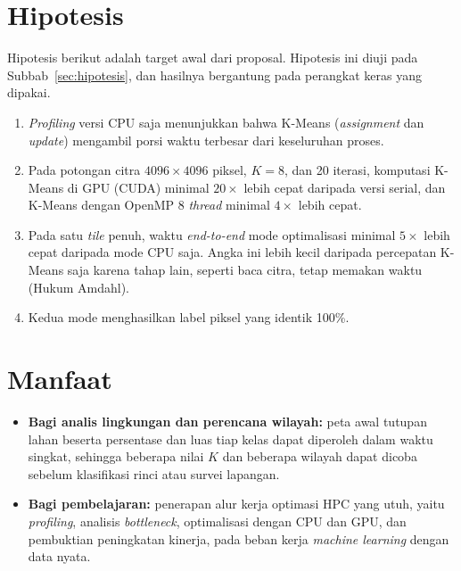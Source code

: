 \section{Hipotesis}
\label{sec:hipotesisawal}
Hipotesis berikut adalah target awal dari proposal. Hipotesis ini diuji pada Subbab~\ref{sec:hipotesis}, dan hasilnya bergantung pada perangkat keras yang dipakai.
\begin{enumerate}
    \item \emph{Profiling} versi CPU saja menunjukkan bahwa K-Means (\emph{assignment} dan \emph{update}) mengambil porsi waktu terbesar dari keseluruhan proses.
    \item Pada potongan citra $4096\times4096$ piksel, $K=8$, dan 20 iterasi, komputasi K-Means di GPU (CUDA) minimal $20\times$ lebih cepat daripada versi serial, dan K-Means dengan OpenMP 8 \emph{thread} minimal $4\times$ lebih cepat.
    \item Pada satu \emph{tile} penuh, waktu \emph{end-to-end} mode optimalisasi minimal $5\times$ lebih cepat daripada mode CPU saja. Angka ini lebih kecil daripada percepatan K-Means saja karena tahap lain, seperti baca citra, tetap memakan waktu (Hukum Amdahl).
    \item Kedua mode menghasilkan label piksel yang identik 100\%.
\end{enumerate}

\section{Manfaat}
\begin{itemize}
    \item \textbf{Bagi analis lingkungan dan perencana wilayah:} peta awal tutupan lahan beserta persentase dan luas tiap kelas dapat diperoleh dalam waktu singkat, sehingga beberapa nilai $K$ dan beberapa wilayah dapat dicoba sebelum klasifikasi rinci atau survei lapangan.
    \item \textbf{Bagi pembelajaran:} penerapan alur kerja optimasi HPC yang utuh, yaitu \emph{profiling}, analisis \emph{bottleneck}, optimalisasi dengan CPU dan GPU, dan pembuktian peningkatan kinerja, pada beban kerja \emph{machine learning} dengan data nyata.
\end{itemize}

